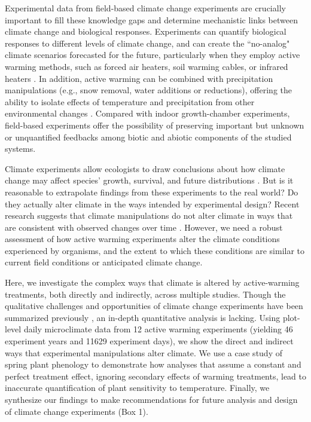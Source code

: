 \documentclass{article}
\begin{document}
\par Experimental data from field-based climate change experiments are crucially important to fill these knowledge gaps and determine mechanistic links between climate change and biological responses. Experiments can quantify biological responses to different levels of climate change, and can create the ``no-analog" climate scenarios forecasted for the future, particularly when they employ active warming methods, such as forced air heaters, soil warming cables, or infrared heaters \citep{shaver2000,williams2007b,aronson2009}. In addition, active warming can be combined with precipitation manipulations (e.g., snow removal, water additions or reductions), offering the ability to isolate effects of temperature and precipitation from other environmental changes \citep [e.g.,][]{price1998,cleland2006,sherry2007,rollinson2012}. Compared with indoor growth-chamber experiments, field-based experiments offer the possibility of preserving important but unknown or unquantified feedbacks among biotic and abiotic components of the studied systems. %

\par Climate experiments allow ecologists to draw conclusions about how climate change may affect species' growth, survival, and future distributions \citep{dukes1999,hobbie1999,morin2010,chuine2012,reich2015,gruner2017}. But is it reasonable to extrapolate findings from these experiments to the real world? Do they actually alter climate in the ways intended by experimental design? Recent research suggests that climate manipulations do not alter climate in ways that are consistent with observed changes over time \citep{wolkovich2012,menke2014}. However, we need a robust assessment of how active warming experiments alter the climate conditions experienced by organisms, and the extent to which these conditions are similar to current field conditions or anticipated climate change. 
\par Here, we investigate the complex ways that climate is altered by active-warming treatments, both directly and indirectly, across multiple studies. Though the qualitative challenges and opportunities of climate change experiments have been summarized previously \citep[e.g.,][]{deboeck2015}, an in-depth quantitative analysis is lacking. Using plot-level daily microclimate data from 12 active warming experiments (yielding 46 experiment years and 11629 experiment days), we show the direct and indirect ways that experimental manipulations alter climate. We use a case study of spring plant phenology to demonstrate how analyses that assume a constant and perfect treatment effect, ignoring secondary effects of warming treatments, lead to inaccurate quantification of plant sensitivity to temperature. Finally, we synthesize our findings to make recommendations for future analysis and design of climate change experiments (Box 1). 
\end{document}
